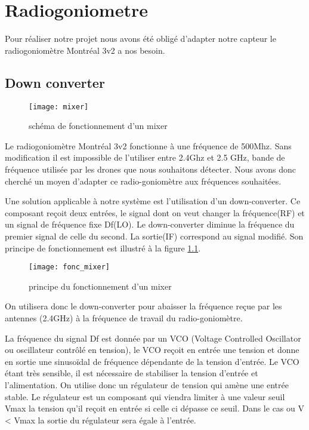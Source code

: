 
\chapter{Radiogoniometre}

Pour réaliser notre projet nous avons été obligé d'adapter notre capteur le radiogoniomètre Montréal 3v2 a nos besoin.

\section{Down converter}


\begin{wrapfigure}{r}{0.4\textwidth}
  
  \texttt{[image: mixer]}
  \caption{schéma de fonctionnement d'un mixer}
\end{wrapfigure}


Le radiogoniomètre Montréal 3v2 fonctionne à une fréquence de 500Mhz. Sans modification il est impossible de l’utiliser entre 2.4Ghz et 2.5 GHz, bande de fréquence utilisée par les drones que nous souhaitons détecter. Nous avons donc cherché un moyen d’adapter ce radio-goniomètre aux fréquences souhaitées.

Une solution applicable à notre système est l'utilisation d'un down-converter. Ce composant reçoit deux entrées, le signal dont on veut changer la fréquence(RF) et un signal de fréquence fixe Df(LO). Le down-converter diminue la fréquence du premier signal de celle du second. La sortie(IF) correspond au signal modifié. Son principe de fonctionnement est illustré à la figure \ref{fig:mix}.



\begin{figure}[h]
  \centering
  \texttt{[image: fonc\_mixer]}
  \caption{principe du fonctionnement d'un mixer}
  \label{fig:mix}
\end{figure}

On utilisera donc le down-converter pour abaisser la fréquence reçue par les antennes (2.4GHz) à la fréquence de travail du radio-goniomètre.

La fréquence du signal Df est donnée par un VCO (Voltage Controlled Oscillator ou oscillateur contrôlé en tension), le VCO reçoit en entrée une tension et donne en sortie une sinusoïdal de fréquence dépendante de la tension d’entrée. Le VCO étant très sensible, il est nécessaire de stabiliser la tension d’entrée et l’alimentation. On utilise donc un régulateur de tension qui amène une entrée stable. Le régulateur est un composant qui viendra limiter à une valeur seuil Vmax la tension qu'il reçoit en entrée si celle ci dépasse ce seuil. Dans le cas ou V < Vmax la sortie du régulateur sera égale à l'entrée.

